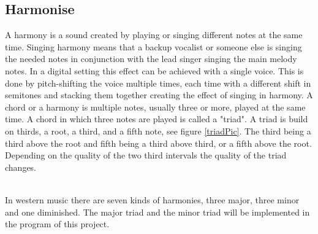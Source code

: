 \subsection{Harmonise}

A harmony is a sound created by playing or singing different notes at the same time\citep{Harmonise02}.
Singing harmony means that a backup vocalist or someone else is singing the needed notes in conjunction with the lead singer singing the main melody notes. In a digital setting this effect can be achieved with a single voice. This is done by pitch-shifting the voice multiple times, each time with a different shift in semitones and stacking them together creating the effect of singing in harmony. 
A chord or a harmony is multiple notes, usually three or more, played at the same time. A chord in which three notes are played is called a "triad"\citep{Harmonise01}. A triad is build on thirds, a root, a third, and a fifth note, see figure \ref{triadPic}. The third being a third above the root and fifth being a third above third, or a fifth above the root. Depending on the quality of the two third intervals the quality of the triad changes. \\

\begin{minipage}{\linewidth}%
\label{triadPic}
\end{minipage}\\

In western music there are seven kinds of harmonies, three major, three minor and one diminished. The major triad and the minor triad will be implemented in the program of this project.